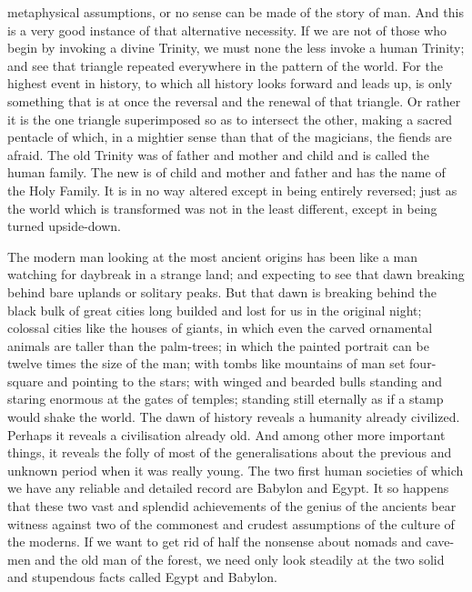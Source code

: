 metaphysical assumptions, or no sense can be made of the story of man. And this is a very good instance of that alternative necessity. If we are not of those who begin by invoking a divine Trinity, we must none the less invoke a human Trinity; and see that triangle repeated everywhere in the pattern of the world. For the highest event in history, to which all history looks forward and leads up, is only something that is at once the reversal and the renewal of that triangle. Or rather it is the one triangle superimposed so as to intersect the other, making a sacred pentacle of which, in a mightier sense than that of the magicians, the fiends are afraid. The old Trinity was of father and mother and child and is called the human family. The new is of child and mother and father and has the name of the Holy Family. It is in no way altered except in being entirely reversed; just as the world which is transformed was not in the least different, except in being turned upside-down.


The modern man looking at the most ancient origins has been like a man watching for daybreak in a strange land; and expecting to see that dawn breaking behind bare uplands or solitary peaks. But that dawn is breaking behind the black bulk of great cities long builded and lost for us in the original night; colossal cities like the houses of giants, in which even the carved ornamental animals are taller than the palm-trees; in which the painted portrait can be twelve times the size of the man; with tombs like mountains of man set four-square and pointing to the stars; with winged and bearded bulls standing and staring enormous at the gates of temples; standing still eternally as if a stamp would shake the world. The dawn of history reveals a humanity already civilized. Perhaps it reveals a civilisation already old. And among other more important things, it reveals the folly of most of the generalisations about the previous and unknown period when it was really young. The two first human societies of which we have any reliable and detailed record are Babylon and Egypt. It so happens that these two vast and splendid achievements of the genius of the ancients bear witness against two of the commonest and crudest assumptions of the culture of the moderns. If we want to get rid of half the nonsense about nomads and cave-men and the old man of the forest, we need only look steadily at the two solid and stupendous facts called Egypt and Babylon.

